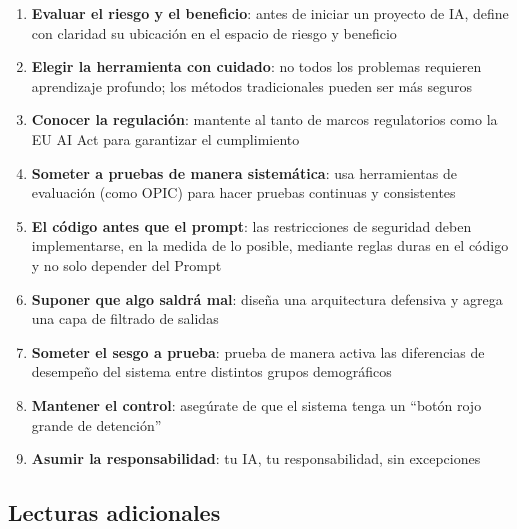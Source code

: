\begin{enumerate}
    \item \textbf{Evaluar el riesgo y el beneficio}: antes de iniciar un proyecto de IA, define con claridad su ubicación en el espacio de riesgo y beneficio
    \item \textbf{Elegir la herramienta con cuidado}: no todos los problemas requieren aprendizaje profundo; los métodos tradicionales pueden ser más seguros
    \item \textbf{Conocer la regulación}: mantente al tanto de marcos regulatorios como la EU AI Act para garantizar el cumplimiento
    \item \textbf{Someter a pruebas de manera sistemática}: usa herramientas de evaluación (como OPIC) para hacer pruebas continuas y consistentes
    \item \textbf{El código antes que el prompt}: las restricciones de seguridad deben implementarse, en la medida de lo posible, mediante reglas duras en el código y no solo depender del Prompt
    \item \textbf{Suponer que algo saldrá mal}: diseña una arquitectura defensiva y agrega una capa de filtrado de salidas
    \item \textbf{Someter el sesgo a prueba}: prueba de manera activa las diferencias de desempeño del sistema entre distintos grupos demográficos
    \item \textbf{Mantener el control}: asegúrate de que el sistema tenga un ``botón rojo grande de detención''
    \item \textbf{Asumir la responsabilidad}: tu IA, tu responsabilidad, sin excepciones
\end{enumerate}

\subsection{Lecturas adicionales}

